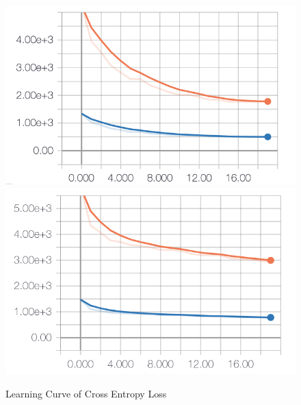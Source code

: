 \documentclass{article}
\begin{document}
\begin{figure}[h]
  \centering
  \includegraphics[scale=0.7]{cross_loss_sc.png}
  \includegraphics[scale=0.68]{cross_loss_pre.png}
  \caption{Learning Curve of Cross Entropy Loss}
\end{figure}

\pagebreak
\end{document}
